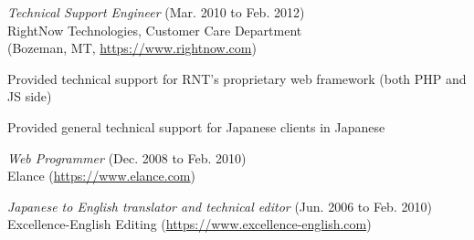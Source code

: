 \documentclass[10pt, a4paper]{article}
\begin{document}
\begin{itemize*}
\begin{itemize*}
    \end{itemize*}
  \item \emph{Technical Support Engineer} (Mar. 2010 to Feb. 2012)\\
    RightNow Technologies, Customer Care Department\\
    (Bozeman, MT, \url{https://www.rightnow.com})
    \begin{itemize*}
      \item Provided technical support for RNT's proprietary web framework (both PHP and JS side)
      \item Provided general technical support for Japanese clients in Japanese
    \end{itemize*}
  \item \emph{Web Programmer} (Dec. 2008 to Feb. 2010)\\
    Elance (\url{https://www.elance.com})
  \item \emph{Japanese to English translator and technical editor} (Jun. 2006 to Feb. 2010)\\
    Excellence-English Editing (\url{https://www.excellence-english.com})
\end{itemize*}
\end{document}

